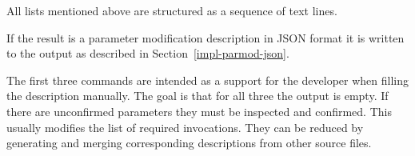 All lists mentioned above are structured as a sequence of text lines.

If the result is a parameter modification description in JSON format it is written to the output as described in 
Section~\ref{impl-parmod-json}.

The first three commands are intended as a support for the developer when filling the description manually. The goal is that
for all three the output is empty. If there are unconfirmed parameters they must be inspected and confirmed. This usually 
modifies the list of required invocations. They can be reduced by generating and merging corresponding descriptions
from other source files.

